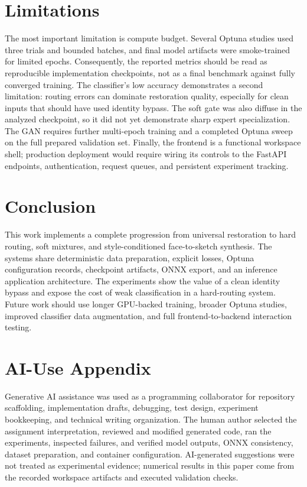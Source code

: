 \documentclass[conference]{IEEEtran}
\begin{document}
\section{Limitations}
The most important limitation is compute budget. Several Optuna studies used three trials and bounded batches, and final model artifacts were smoke-trained for limited epochs. Consequently, the reported metrics should be read as reproducible implementation checkpoints, not as a final benchmark against fully converged training. The classifier's low accuracy demonstrates a second limitation: routing errors can dominate restoration quality, especially for clean inputs that should have used identity bypass. The soft gate was also diffuse in the analyzed checkpoint, so it did not yet demonstrate sharp expert specialization. The GAN requires further multi-epoch training and a completed Optuna sweep on the full prepared validation set. Finally, the frontend is a functional workspace shell; production deployment would require wiring its controls to the FastAPI endpoints, authentication, request queues, and persistent experiment tracking.

\section{Conclusion}
This work implements a complete progression from universal restoration to hard routing, soft mixtures, and style-conditioned face-to-sketch synthesis. The systems share deterministic data preparation, explicit losses, Optuna configuration records, checkpoint artifacts, ONNX export, and an inference application architecture. The experiments show the value of a clean identity bypass and expose the cost of weak classification in a hard-routing system. Future work should use longer GPU-backed training, broader Optuna studies, improved classifier data augmentation, and full frontend-to-backend interaction testing.

\section*{AI-Use Appendix}
Generative AI assistance was used as a programming collaborator for repository scaffolding, implementation drafts, debugging, test design, experiment bookkeeping, and technical writing organization. The human author selected the assignment interpretation, reviewed and modified generated code, ran the experiments, inspected failures, and verified model outputs, ONNX consistency, dataset preparation, and container configuration. AI-generated suggestions were not treated as experimental evidence; numerical results in this paper come from the recorded workspace artifacts and executed validation checks.
\end{document}
